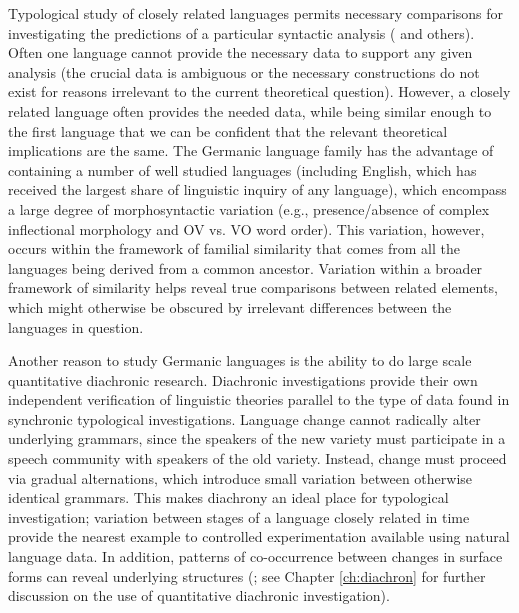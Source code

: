 Typological study of closely related languages permits necessary comparisons for investigating the predictions of a particular syntactic analysis (\citealt{kayne.1996} and others). Often one language cannot provide the necessary data to support any given analysis (the crucial data is ambiguous or the necessary constructions do not exist for reasons irrelevant to the current theoretical question). However, a closely related language often provides the needed data, while being similar enough to the first language that we can be confident that the relevant theoretical implications are the same. The Germanic language family has the advantage of containing a number of well studied languages (including English, which has received the largest share of linguistic inquiry of any language), which encompass a large degree of morphosyntactic variation (e.g., presence/absence of complex inflectional morphology and OV vs. VO word order). This variation, however, occurs within the framework of familial similarity that comes from all the languages being derived from a common ancestor. Variation within a broader framework of similarity helps reveal true comparisons between related elements, which might otherwise be obscured by irrelevant differences between the languages in question.

Another reason to study Germanic languages is the ability to do large scale quantitative diachronic research. Diachronic investigations provide their own independent verification of linguistic theories parallel to the type of data found in synchronic typological investigations. Language change cannot radically alter underlying grammars, since the speakers of the new variety must participate in a speech community with speakers of the old variety. Instead, change must proceed via gradual alternations, which introduce small variation between otherwise identical grammars. This makes diachrony an ideal place for typological investigation; variation between stages of a language closely related in time provide the nearest example to controlled experimentation available using natural language data. In addition, patterns of co-occurrence between changes in surface forms can reveal underlying structures (\citet{Kroch.1989}; see Chapter \ref{ch:diachron} for further discussion on the use of quantitative diachronic investigation).

